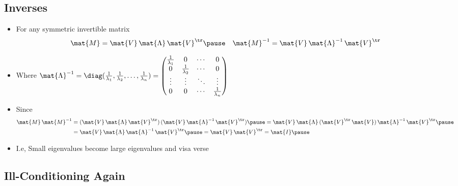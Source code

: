 
\begin{slide}
\section[-2]{Inverses}

\begin{PauseHighLight}
  \begin{itemize}
  \item For any symmetric invertible matrix
    \begin{align*}
      \mat{M} &=\mat{V}\,\mat{\Lambda}\,\mat{V}^\tr \pause &
      \mat{M}^{-1} &=\mat{V}\,\mat{\Lambda}^{-1}\,\mat{V}^\tr
    \end{align*}
  \item Where $\mat{\Lambda}^{-1} = \diag(\tfrac{1}{\lambda_1},
    \tfrac{1}{\lambda_2}, \ldots, \tfrac{1}{\lambda_n}) =
    \begin{pmatrix}
      \tfrac{1}{\lambda_1} & 0 & \cdots & 0 \\
      0 & \tfrac{1}{\lambda_2}  & \cdots & 0 \\
      \vdots & \vdots &\ddots &\vdots \\
      0 & 0 & \cdots & \tfrac{1}{\lambda_n}
    \end{pmatrix}$\pause
  \item Since
    \begin{align*}
       \mat{M}\,\mat{M}^{-1} &= (\mat{V}\,\mat{\Lambda}\,\mat{V}^\tr)\,
       (\mat{V}\,\mat{\Lambda}^{-1}\,\mat{V}^\tr)\pause
       = \mat{V}\,\mat{\Lambda}\,(\mat{V}^\tr\,
       \mat{V})\,\mat{\Lambda}^{-1}\,\mat{V}^\tr\pause \\
       &= \mat{V}\,\mat{\Lambda}\,\mat{\Lambda}^{-1}\,\mat{V}^\tr\pause
       = \mat{V}\,\mat{V}^\tr = \mat{I}\pause
    \end{align*}
  \item I.e, Small eigenvalues become large eigenvalues and visa verse\pause
  \end{itemize}
\end{PauseHighLight}

\end{slide}


\begin{slide}
\section[-1.5]{Ill-Conditioning Again}

\pb\pause{}
\begin{center}
  \pause
\end{center}

\end{slide}

